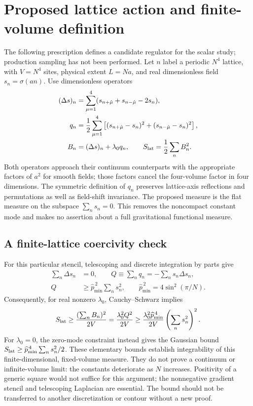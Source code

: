 \section{Proposed lattice action and finite-volume definition}
\label{app:lattice-action}

The following prescription defines a candidate regulator for the scalar study; production sampling has not been performed.  Let $n$ label a periodic $N^4$ lattice, with $V=N^4$ sites, physical extent $L=Na$, and real dimensionless field $s_n=\sigma(an)$.  Use dimensionless operators
\begin{align}
 (\Delta s)_n&=\sum_{\mu=1}^4(s_{n+\hat\mu}+s_{n-\hat\mu}-2s_n),\\
 q_n&=\frac12\sum_{\mu=1}^4\left[(s_{n+\hat\mu}-s_n)^2+(s_{n-\hat\mu}-s_n)^2\right],\\
 B_n&=(\Delta s)_n+\lambda_0 q_n,\qquad S_{\rm lat}=\frac12\sum_n B_n^2.
 \label{eq:proposed-lattice-action}
\end{align}
Both operators approach their continuum counterparts with the appropriate factors of $a^2$ for smooth fields; those factors cancel the four-volume factor in four dimensions.  The symmetric definition of $q_n$ preserves lattice-axis reflections and permutations as well as field-shift invariance.  The proposed measure is the flat measure on the subspace $\sum_n s_n=0$.  This removes the noncompact constant mode and makes no assertion about a full gravitational functional measure.

\subsection{A finite-lattice coercivity check}
\label{app:coercivity}

For this particular stencil, telescoping and discrete integration by parts give
\begin{align}
 \sum_n\Delta s_n&=0,\qquad Q\equiv\sum_n q_n=-\sum_n s_n\Delta s_n,\\
 Q&\geq\widehat p_{\min}^{\,2}\sum_n s_n^2,
 \qquad\widehat p_{\min}^{\,2}=4\sin^2(\pi/N).
\end{align}
Consequently, for real nonzero $\lambda_0$, Cauchy--Schwarz implies
\begin{equation}
 S_{\rm lat}\geq\frac{(\sum_n B_n)^2}{2V}
 =\frac{\lambda_0^2 Q^2}{2V}
 \geq\frac{\lambda_0^2\widehat p_{\min}^{\,4}}{2V}
 \left(\sum_n s_n^2\right)^2.
 \label{eq:finite-lattice-bound}
\end{equation}
For $\lambda_0=0$, the zero-mode constraint instead gives the Gaussian bound
$S_{\rm lat}\geq\widehat p_{\min}^{\,4}\sum_n s_n^2/2$.
These elementary bounds establish integrability of this finite-dimensional, fixed-volume measure.  They do not prove a continuum or infinite-volume limit: the constants deteriorate as $N$ increases.  Positivity of a generic square would not suffice for this argument; the nonnegative gradient stencil and telescoping Laplacian are essential.  The bound should not be transferred to another discretization or contour without a new proof.

